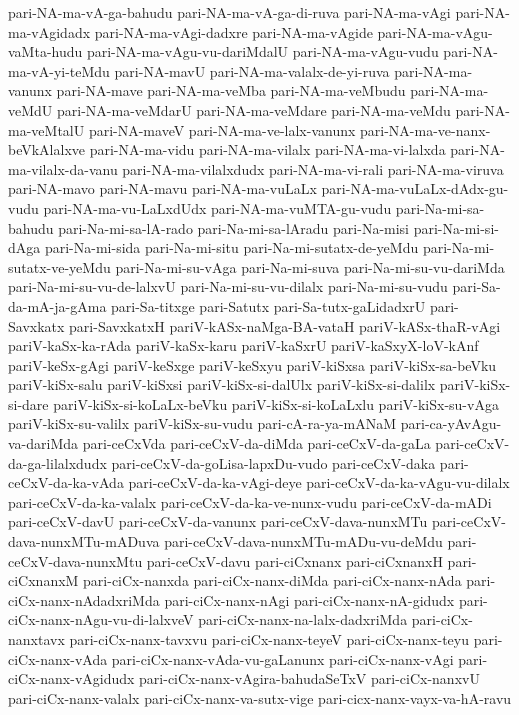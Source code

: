 {pari-NA-ma-vA-ga-bahudu
pari-NA-ma-vA-ga-di-ruva
pari-NA-ma-vAgi
pari-NA-ma-vAgidadx
pari-NA-ma-vAgi-dadxre
pari-NA-ma-vAgide
pari-NA-ma-vAgu-vaMta-hudu
pari-NA-ma-vAgu-vu-dariMdalU
pari-NA-ma-vAgu-vudu
pari-NA-ma-vA-yi-teMdu
pari-NA-mavU
pari-NA-ma-valalx-de-yi-ruva
pari-NA-ma-vanunx
pari-NA-mave
pari-NA-ma-veMba
pari-NA-ma-veMbudu
pari-NA-ma-veMdU
pari-NA-ma-veMdarU
pari-NA-ma-veMdare
pari-NA-ma-veMdu
pari-NA-ma-veMtalU
pari-NA-maveV
pari-NA-ma-ve-lalx-vanunx
pari-NA-ma-ve-nanx-beVkAlalxve
pari-NA-ma-vidu
pari-NA-ma-vilalx
pari-NA-ma-vi-lalxda
pari-NA-ma-vilalx-da-vanu
pari-NA-ma-vilalxdudx
pari-NA-ma-vi-rali
pari-NA-ma-viruva
pari-NA-mavo
pari-NA-mavu
pari-NA-ma-vuLaLx
pari-NA-ma-vuLaLx-dAdx-gu-vudu
pari-NA-ma-vu-LaLxdUdx
pari-NA-ma-vuMTA-gu-vudu
pari-Na-mi-sa-bahudu
pari-Na-mi-sa-lA-rado
pari-Na-mi-sa-lAradu
pari-Na-misi
pari-Na-mi-si-dAga
pari-Na-mi-sida
pari-Na-mi-situ
pari-Na-mi-sutatx-de-yeMdu
pari-Na-mi-sutatx-ve-yeMdu
pari-Na-mi-su-vAga
pari-Na-mi-suva
pari-Na-mi-su-vu-dariMda
pari-Na-mi-su-vu-de-lalxvU
pari-Na-mi-su-vu-dilalx
pari-Na-mi-su-vudu
pari-Sa-da-mA-ja-gAma
pari-Sa-titxge
pari-Satutx
pari-Sa-tutx-gaLidadxrU
pari-Savxkatx
pari-SavxkatxH
pariV-kASx-naMga-BA-vataH
pariV-kASx-thaR-vAgi
pariV-kaSx-ka-rAda
pariV-kaSx-karu
pariV-kaSxrU
pariV-kaSxyX-loV-kAnf
pariV-keSx-gAgi
pariV-keSxge
pariV-keSxyu
pariV-kiSxsa
pariV-kiSx-sa-beVku
pariV-kiSx-salu
pariV-kiSxsi
pariV-kiSx-si-dalUlx
pariV-kiSx-si-dalilx
pariV-kiSx-si-dare
pariV-kiSx-si-koLaLx-beVku
pariV-kiSx-si-koLaLxlu
pariV-kiSx-su-vAga
pariV-kiSx-su-valilx
pariV-kiSx-su-vudu
pari-cA-ra-ya-mANaM
pari-ca-yAvAgu-va-dariMda
pari-ceCxVda
pari-ceCxV-da-diMda
pari-ceCxV-da-gaLa
pari-ceCxV-da-ga-lilalxdudx
pari-ceCxV-da-goLisa-lapxDu-vudo
pari-ceCxV-daka
pari-ceCxV-da-ka-vAda
pari-ceCxV-da-ka-vAgi-deye
pari-ceCxV-da-ka-vAgu-vu-dilalx
pari-ceCxV-da-ka-valalx
pari-ceCxV-da-ka-ve-nunx-vudu
pari-ceCxV-da-mADi
pari-ceCxV-davU
pari-ceCxV-da-vanunx
pari-ceCxV-dava-nunxMTu
pari-ceCxV-dava-nunxMTu-mADuva
pari-ceCxV-dava-nunxMTu-mADu-vu-deMdu
pari-ceCxV-dava-nunxMtu
pari-ceCxV-davu
pari-ciCxnanx
pari-ciCxnanxH
pari-ciCxnanxM
pari-ciCx-nanxda
pari-ciCx-nanx-diMda
pari-ciCx-nanx-nAda
pari-ciCx-nanx-nAdadxriMda
pari-ciCx-nanx-nAgi
pari-ciCx-nanx-nA-gidudx
pari-ciCx-nanx-nAgu-vu-di-lalxveV
pari-ciCx-nanx-na-lalx-dadxriMda
pari-ciCx-nanxtavx
pari-ciCx-nanx-tavxvu
pari-ciCx-nanx-teyeV
pari-ciCx-nanx-teyu
pari-ciCx-nanx-vAda
pari-ciCx-nanx-vAda-vu-gaLanunx
pari-ciCx-nanx-vAgi
pari-ciCx-nanx-vAgidudx
pari-ciCx-nanx-vAgira-bahudaSeTxV
pari-ciCx-nanxvU
pari-ciCx-nanx-valalx
pari-ciCx-nanx-va-sutx-vige
pari-cicx-nanx-vayx-va-hA-ravu
}
